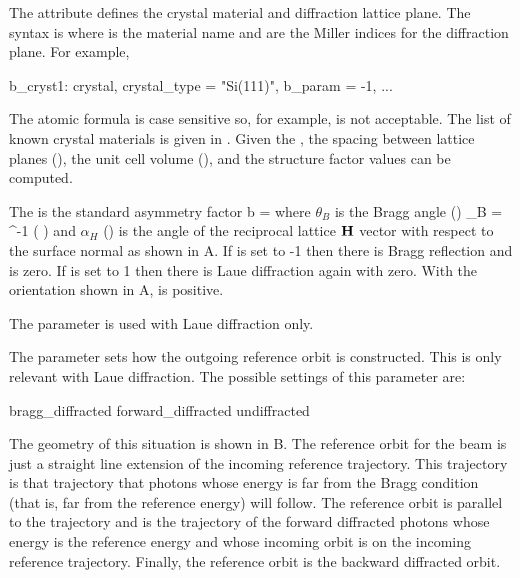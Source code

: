 The  attribute defines the crystal material and
diffraction lattice plane. The syntax is  where 
is the material name and  are the Miller
indices for the diffraction plane. For example,
\begin{example}
  b_cryst1: crystal, crystal_type = "Si(111)", b_param = -1, ...
\end{example}
The atomic formula is case sensitive so, for example, 
is not acceptable. The list of known crystal materials is given in
. Given the , the spacing between
lattice planes (), the unit cell volume
(), and the structure factor\cite{b:batterman} values
can be computed.

The  is the standard asymmetry factor
\Begineq
  b =  
  \label{batat}
\Endeq
where $\theta_B$ is the Bragg angle () 
\Begineq
  \theta_B = \sin^{-1} \left(  \right)
  \label{tsl2d}
\Endeq
and $\alpha_H$ () is the angle of the reciprocal
lattice ${\bf H}$ vector with respect to the surface normal as shown in
A.  If  is set to -1 then there is
Bragg reflection and  is zero. If  is set to 1
then there is Laue diffraction again with  zero. With the
orientation shown in A,  is positive.

The  parameter is used with Laue diffraction only.

The  parameter sets how the outgoing reference
orbit is constructed. This is only relevant with Laue diffraction.
The possible settings of this parameter are:
\begin{example}
  bragg_diffracted
  forward_diffracted
  undiffracted
\end{example}
The geometry of this situation is shown in B. The
reference orbit for the  beam is just a straight line
extension of the incoming reference trajectory. This trajectory is
that trajectory that photons whose energy is far from the Bragg
condition (that is, far from the reference energy) will follow. The
 reference orbit is parallel to the
 trajectory and is the trajectory of the forward
diffracted photons whose energy is the reference energy and whose
incoming orbit is on the incoming reference trajectory. Finally, the
 reference orbit is the backward diffracted orbit.

